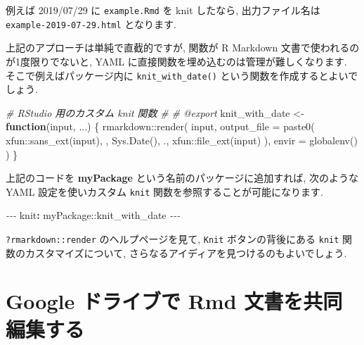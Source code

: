 \documentclass[
  11pt,
  lualatex,
  ja=standard]{bxjsreport}
\newenvironment{Shaded}{\begin{snugshade}}{\end{snugshade}}
\newcommand{\AttributeTok}[1]{\textcolor[rgb]{0.77,0.63,0.00}{#1}}
\newcommand{\CommentTok}[1]{\textcolor[rgb]{0.56,0.35,0.01}{\textit{#1}}}
\newcommand{\ControlFlowTok}[1]{\textcolor[rgb]{0.13,0.29,0.53}{\textbf{#1}}}
\newcommand{\FunctionTok}[1]{\textcolor[rgb]{0.00,0.00,0.00}{#1}}
\newcommand{\KeywordTok}[1]{\textcolor[rgb]{0.13,0.29,0.53}{\textbf{#1}}}
\newcommand{\NormalTok}[1]{#1}
\newcommand{\OtherTok}[1]{\textcolor[rgb]{0.56,0.35,0.01}{#1}}
\newcommand{\PreprocessorTok}[1]{\textcolor[rgb]{0.56,0.35,0.01}{\textit{#1}}}
\newcommand{\SpecialCharTok}[1]{\textcolor[rgb]{0.00,0.00,0.00}{#1}}
\newcommand{\StringTok}[1]{\textcolor[rgb]{0.31,0.60,0.02}{#1}}
\begin{document}
例えば 2019/07/29 に \texttt{example.Rmd} を knit したなら, 出力ファイル名は \texttt{example-2019-07-29.html} となります.

上記のアプローチは単純で直截的ですが, 関数が R Markdown 文書で使われるのが1度限りでないと, YAML に直接関数を埋め込むのは管理が難しくなります. そこで例えばパッケージ内に \texttt{knit\_with\_date()} という関数を作成するとよいでしょう.

\begin{Shaded}
\begin{Highlighting}[numbers=left,,]
\CommentTok{\#\textquotesingle{} RStudio 用のカスタム knit 関数}
\CommentTok{\#\textquotesingle{}}
\CommentTok{\#\textquotesingle{} @export}
\NormalTok{knit\_with\_date }\OtherTok{\textless{}{-}} \ControlFlowTok{function}\NormalTok{(input, ...) \{}
\NormalTok{  rmarkdown}\SpecialCharTok{::}\FunctionTok{render}\NormalTok{(}
\NormalTok{    input,}
    \AttributeTok{output\_file =} \FunctionTok{paste0}\NormalTok{(}
\NormalTok{        xfun}\SpecialCharTok{::}\FunctionTok{sans\_ext}\NormalTok{(input), }\StringTok{\textquotesingle{}{-}\textquotesingle{}}\NormalTok{, }\FunctionTok{Sys.Date}\NormalTok{(), }\StringTok{\textquotesingle{}.\textquotesingle{}}\NormalTok{,}
\NormalTok{        xfun}\SpecialCharTok{::}\FunctionTok{file\_ext}\NormalTok{(input)}
\NormalTok{    ),}
    \AttributeTok{envir =} \FunctionTok{globalenv}\NormalTok{()}
\NormalTok{  )}
\NormalTok{\}}
\end{Highlighting}
\end{Shaded}

上記のコードを \textbf{myPackage} という名前のパッケージに追加すれば, 次のような YAML 設定を使いカスタム \texttt{knit} 関数を参照することが可能になります.

\begin{Shaded}
\begin{Highlighting}[]
\PreprocessorTok{{-}{-}{-}}
\FunctionTok{knit}\KeywordTok{:}\AttributeTok{ myPackage::knit\_with\_date}
\PreprocessorTok{{-}{-}{-}}
\end{Highlighting}
\end{Shaded}

\texttt{?rmarkdown::render} のヘルプページを見て, \texttt{Knit} ボタンの背後にある \texttt{knit} 関数のカスタマイズについて, さらなるアイディアを見つけるのもよいでしょう.

\hypertarget{google-drive}{%
\section{Google ドライブで Rmd 文書を共同編集する}\label{google-drive}}
\end{document}

